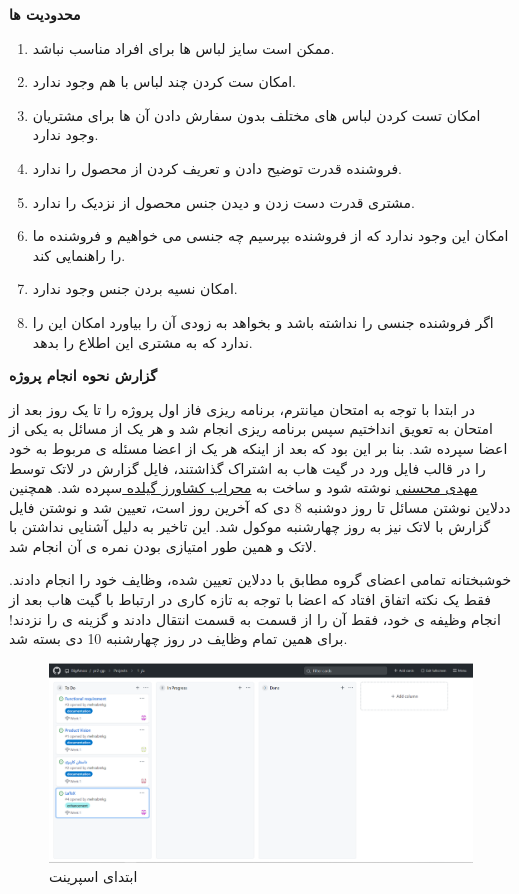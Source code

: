 \documentclass[12pt,a4paper]{article}
\begin{document}
\textbf{	محدودیت ها }

\begin{enumerate}
	

\item
ممکن است سایز لباس ها برای افراد مناسب نباشد.
\item
امکان ست کردن چند لباس با هم وجود ندارد.
\item
امکان تست کردن لباس های مختلف بدون سفارش دادن آن ها برای مشتریان وجود ندارد.
\item
فروشنده قدرت توضیح دادن و تعریف کردن از محصول را ندارد.
\item
مشتری قدرت دست زدن و دیدن جنس محصول از نزدیک را ندارد.
\item
امکان این وجود ندارد که از فروشنده بپرسیم چه جنسی می خواهیم و فروشنده ما را راهنمایی کند.
\item
امکان نسیه بردن جنس وجود ندارد.
\item
اگر فروشنده جنسی را نداشته باشد و بخواهد به زودی آن را بیاورد امکان این را ندارد که به مشتری این اطلاع را بدهد.
	
\end{enumerate}	
\pagebreak

\textbf{گزارش نحوه انجام پروژه}

در ابتدا با توجه به امتحان میانترم، برنامه ریزی فاز اول پروژه را تا یک روز بعد از امتحان به تعویق انداختیم سپس برنامه ریزی انجام شد و هر یک از مسائل به یکی از اعضا سپرده شد. بنا بر این بود که بعد از اینکه هر یک از اعضا مسئله ی مربوط به خود را در قالب فایل ورد در گیت هاب به اشتراک گذاشتند، فایل گزارش در لاتک توسط \underline{مهدی محسنی} نوشته شود و ساخت  به \underline{محراب کشاورز گیلده }سپرده شد. همچنین ددلاین نوشتن مسائل تا روز دوشنبه 8 دی که آخرین روز  است، تعیین شد و نوشتن فایل گزارش با لاتک نیز به روز چهارشنبه موکول شد. این تاخیر به دلیل آشنایی نداشتن با لاتک و همین طور امتیازی بودن نمره ی آن انجام شد.

خوشبختانه تمامی اعضای گروه مطابق با ددلاین تعیین شده، وظایف خود را انجام دادند. فقط یک نکته اتفاق افتاد که اعضا با توجه به تازه کاری در ارتباط با گیت هاب بعد از انجام وظیفه ی خود، فقط آن را از قسمت  به قسمت  انتقال دادند و گزینه ی  را نزدند! برای همین تمام وظایف در روز چهارشنبه 10 دی بسته شد.



	\begin{figure}[h!]
		\begin{center}
			\includegraphics[width=14cm]{images/screenshot_1.png}	
		\end{center}
	\caption{ابتدای اسپرینت}
	\end{figure}
\end{document}
